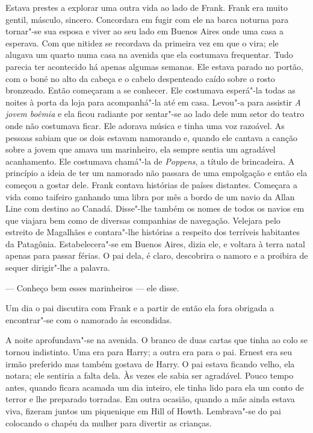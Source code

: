Estava prestes a explorar uma outra vida ao lado de Frank.  Frank era muito
gentil, másculo, sincero.  Concordara em fugir com ele na barca noturna para
tornar"-se sua esposa e viver ao seu lado em Buenos Aires onde uma casa a
esperava.  Com que nitidez se recordava da primeira vez em que o vira; ele
alugava um quarto numa casa na avenida que ela costumava frequentar.  Tudo
parecia ter acontecido há apenas algumas semanas.  Ele estava parado no portão,
com o boné no alto da cabeça e o cabelo despenteado caído sobre o rosto
bronzeado.  Então começaram a se conhecer.  Ele costumava esperá"-la todas as
noites à porta da loja para acompanhá"-la até em casa.  Levou"-a para assistir
\textit{A jovem boêmia} e ela ficou radiante por sentar"-se ao lado dele num
setor do teatro onde não costumava ficar.  Ele adorava música e tinha uma voz
razoável.  As pessoas sabiam que os dois estavam namorando e, quando ele
cantava a canção sobre a jovem que amava um marinheiro, ela sempre sentia um
agradável acanhamento.  Ele costumava chamá"-la de \textit{Poppens}, a título
de brincadeira.  A princípio a ideia de ter um namorado não passara de uma
empolgação e então ela começou a gostar dele.  Frank contava histórias de
países distantes.  Começara a vida como taifeiro ganhando uma libra por mês a
bordo de um navio da Allan Line com destino ao Canadá.  Disse"-lhe também os
nomes de todos os navios em que viajara bem como de diversas companhias de
navegação.  Velejara pelo estreito de Magalhães e contara"-lhe histórias a
respeito dos terríveis habitantes da Patagônia.  Estabelecera"-se em Buenos
Aires, dizia ele, e voltara à terra natal apenas para passar férias.  O pai
dela, é claro, descobrira o namoro e a proibira de sequer dirigir"-lhe a
palavra.

--- Conheço bem esses marinheiros --- ele disse.

Um dia o pai discutira com Frank e a partir de então ela fora obrigada a
encontrar"-se com o namorado às escondidas.

A noite aprofundava"-se na avenida.  O branco de duas cartas que tinha ao colo
se tornou indistinto.  Uma era para Harry; a outra era para o pai.  Ernest era
seu irmão preferido mas também gostava de Harry.  O pai estava ficando velho,
ela notara; ele sentiria a falta dela.  Às vezes ele sabia ser agradável.
Pouco tempo antes, quando ficara acamada um dia inteiro, ele tinha lido para
ela um conto de terror e lhe preparado torradas.  Em outra ocasião, quando a
mãe ainda estava viva, fizeram juntos um piquenique em Hill of Howth.
Lembrava"-se do pai colocando o chapéu da mulher para divertir as crianças.

